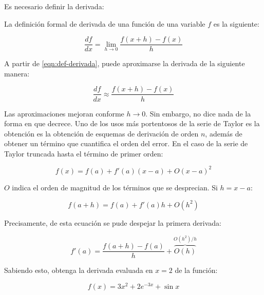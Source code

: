 \begin{ex}

    Es necesario definir la derivada:

    \begin{definition}[La derivada]
        La definición formal de derivada de una función de una variable $f$ es
        la siguiente:

        \begin{equation}\label{eqn:def-derivada}
            \frac{df}{dx} = \lim_{h \rightarrow 0} \frac{f(x + h) - f(x)}{h}
        \end{equation}

    \end{definition}
    A partir de \ref{eqn:def-derivada}, puede aproximarse la derivada de la
    siguiente manera:

    \begin{equation*}
        \frac{df}{dx} \approx \frac{f(x + h) - f(x)}{h}
    \end{equation*}

    Las aproximaciones mejoran conforme $h \rightarrow 0$. Sin embargo, no
    dice nada de la forma en que decrece. Uno de los usos más portentosos de
    la serie de Taylor es la obtención es la obtención de esquemas de
    derivación de orden $n$, además de obtener un término que cuantifica el
    orden del error. En el caso de la serie de Taylor truncada hasta el
    término de primer orden:

    \begin{equation*}
        f(x) = f(a) + f'(a)(x-a) + O(x-a)^2
    \end{equation*}

    $O$ indica el orden de magnitud de los términos que se desprecian. Si
    $h = x - a$:

    \begin{equation*}
        f(a + h) = f(a) + f'(a)h + O(h^2)
    \end{equation*}

    Precisamente, de esta ecuación se pude despejar la primera derivada:

    \begin{equation*}
        f'(a) = \frac{f(a + h) - f(a)}{h} + \overbrace{O(h)}^{O(h^2)/h}
    \end{equation*}

    Sabiendo esto, obtenga la derivada evaluada en $x = 2$ de la función:

    \begin{equation*}
        f(x) = 3x^2 + 2e^{-3x} + \sin x
    \end{equation*}


\end{ex}
